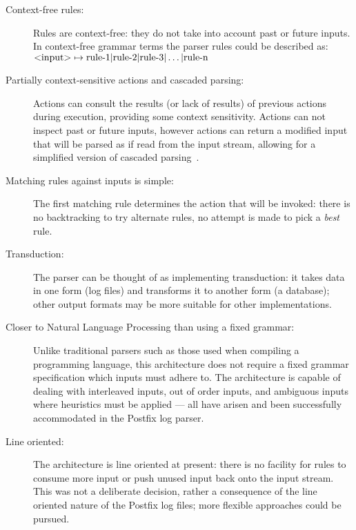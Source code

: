 \documentclass{svmult}
\begin{document}
\begin{description}

    \item [Context-free rules:]  Rules are context-free: they do not take
        into account past or future inputs.  In context-free grammar terms
        the parser rules could be described as:
        $\text{\textless{}input\textgreater{}} \mapsto \text{rule-1} |
        \text{rule-2} | \text{rule-3} | \dots | \text{rule-n}$

    \item [Partially context-sensitive actions and cascaded parsing:]
        Actions can consult the results (or lack of results) of previous
        actions during execution, providing some context sensitivity.
        Actions can not inspect past or future inputs, however actions can
        return a modified input that will be parsed as if read from the
        input stream, allowing for a simplified version of cascaded
        parsing~\cite{cascaded-parsing}.

    \item [Matching rules against inputs is simple:]  The first matching
        rule determines the action that will be invoked: there is no
        backtracking to try alternate rules, no attempt is made to pick a
        \textit{best\/} rule.

    \item [Transduction:]  The parser can be thought of as implementing
        transduction: it takes data in one form (log files) and transforms
        it to another form (a database); other output formats may be more
        suitable for other implementations.

    \item [Closer to Natural Language Processing than using a fixed
        grammar:] Unlike traditional parsers such as those used when
        compiling a programming language, this architecture does not
        require a fixed grammar specification which inputs must adhere to.
        The architecture is capable of dealing with interleaved inputs, out
        of order inputs, and ambiguous inputs where heuristics must be
        applied --- all have arisen and been successfully accommodated in
        the Postfix log parser.

    \item [Line oriented:]  The architecture is line oriented at present:
        there is no facility for rules to consume more input or push unused
        input back onto the input stream.  This was not a deliberate
        decision, rather a consequence of the line oriented nature of the
        Postfix log files; more flexible approaches could be pursued.

\end{description}
\end{document}
